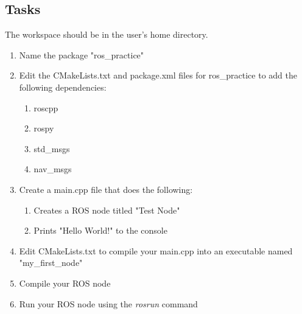 \documentclass[12pt]{article}
\newenvironment{task}[2][Task]{\begin{trivlist}
\item[\hskip \labelsep {\bfseries #1}\hskip \labelsep {\bfseries #2.}]}{\end{trivlist}}
\begin{document}
\subsection*{Tasks}

\begin{task}{1. Create a ROS workspace}
\end{task}
The workspace should be in the user's home directory.


\begin{task}{2. Create a ROS package in your ROS workspace}
\end{task}

\begin{enumerate}
\item Name the package "ros\_practice"
\item Edit the CMakeLists.txt and package.xml files for ros\_practice to add the following dependencies:
\begin{enumerate}
\item roscpp
\item rospy
\item std\_msgs
\item nav\_msgs
\end{enumerate}

\item Create a main.cpp file that does the following:
\begin{enumerate}
\item Creates a ROS node titled "Test Node"
\item Prints "Hello World!" to the console
\end{enumerate}

\item Edit CMakeLists.txt to compile your main.cpp into an executable named "my\_first\_node"

\item Compile your ROS node
\item Run your ROS node using the \emph{rosrun} command
\end{enumerate}

\begin{task}
{3. Create three nodes that publish and subscribe messages}
\end{task}
\end{document}

